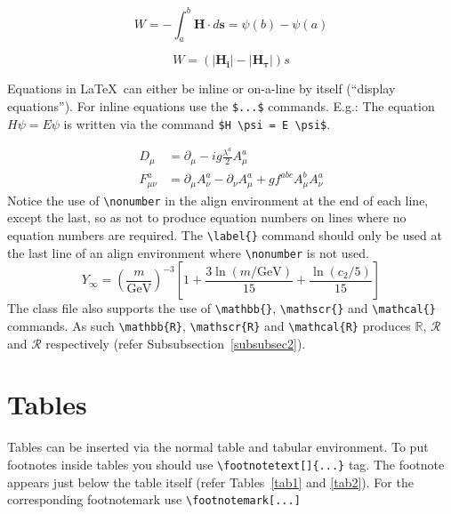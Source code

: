 \documentclass[sn-mathphys]{sn-jnl}%
\begin{document}
\begin{equation}
  W=-\int_{a}^{b}\boldsymbol{H \cdot } d\boldsymbol{s} = \psi(b) - \psi(a)    \label{cadentialGravityProofEq}
\end{equation}

\begin{equation}
  W =   \left( \left| \boldsymbol{H_{i}} \right| - \left|  \boldsymbol{H_{\tau}} \right| \right)s  \label{cadentialGravityEq}
\end{equation}



Equations in \LaTeX\ can either be inline or on-a-line by itself (``display equations''). For
inline equations use the \verb+$...$+ commands. E.g.: The equation
$H\psi = E \psi$ is written via the command \verb+$H \psi = E \psi$+.

\begin{align}
D_\mu &=  \partial_\mu - ig \frac{\lambda^a}{2} A^a_\mu \nonumber \\
F^a_{\mu\nu} &= \partial_\mu A^a_\nu - \partial_\nu A^a_\mu + g f^{abc} A^b_\mu A^a_\nu \label{eq2}
\end{align}
Notice the use of \verb+\nonumber+ in the align environment at the end
of each line, except the last, so as not to produce equation numbers on
lines where no equation numbers are required. The \verb+\label{}+ command
should only be used at the last line of an align environment where
\verb+\nonumber+ is not used.
\begin{equation}
Y_\infty = \left( \frac{m}{\textrm{GeV}} \right)^{-3}
    \left[ 1 + \frac{3 \ln(m/\textrm{GeV})}{15}
    + \frac{\ln(c_2/5)}{15} \right]
\end{equation}
The class file also supports the use of \verb+\mathbb{}+, \verb+\mathscr{}+ and
\verb+\mathcal{}+ commands. As such \verb+\mathbb{R}+, \verb+\mathscr{R}+
and \verb+\mathcal{R}+ produces $\mathbb{R}$, $\mathscr{R}$ and $\mathcal{R}$
respectively (refer Subsubsection~\ref{subsubsec2}).

\section{Tables}\label{sec5}

Tables can be inserted via the normal table and tabular environment. To put
footnotes inside tables you should use \verb+\footnotetext[]{...}+ tag.
The footnote appears just below the table itself (refer Tables~\ref{tab1} and \ref{tab2}). 
For the corresponding footnotemark use \verb+\footnotemark[...]+
\end{document}

